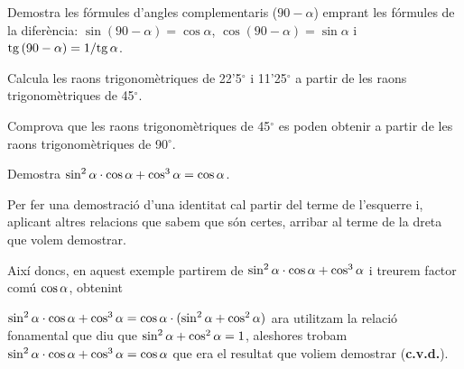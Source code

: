 \begin{mylist}
	
	\exer
	Demostra les fórmules d'angles complementaris ($90-\alpha$) emprant les fórmules de la
	diferència: $\sin(90-\alpha)=\cos\alpha$, $\cos(90-\alpha)=\sin\alpha$ i $\mathrm{tg}\,(90-\alpha)=1/\mathrm{tg}\,\alpha$.
	
	
	\exer
	Calcula les raons trigonomètriques de
	22'5${}^\circ$ i 11'25${}^\circ$ a partir de les
	raons trigonomètriques de 45${}^\circ$.
		
	
	
	
	\exer
	Comprova que les raons trigonomètriques de 45${}^\circ$ es
	poden obtenir a partir de les raons trigonomètriques de 90${}^\circ$.
	
	
	\exer[-1] Demostra $\sin^2 \alpha \cdot \cos \alpha + \cos^3 \alpha= \cos \alpha$. 
	
	\end{mylist}
	
	\begin{example}
		Per fer una demostració d'una identitat cal partir del terme de l'esquerre i, aplicant altres relacions que sabem que són certes, arribar al terme de la dreta que volem demostrar. 
		
		Així doncs, en aquest exemple partirem de $\sin^2 \alpha \cdot \cos \alpha + \cos^3 \alpha$ i treurem factor comú $\cos \alpha$, obtenint
		
		$\sin^2 \alpha \cdot \cos \alpha + \cos^3 \alpha = \cos\alpha \cdot (\sin^2 \alpha + \cos^2 \alpha)$ ara utilitzam la relació fonamental que diu que $\sin^2 \alpha + \cos^2 \alpha=1$, aleshores trobam $\sin^2 \alpha \cdot \cos \alpha + \cos^3 \alpha = \cos\alpha$ que era el resultat que voliem demostrar (\textbf{c.v.d.}).
		
	\end{example}
	
